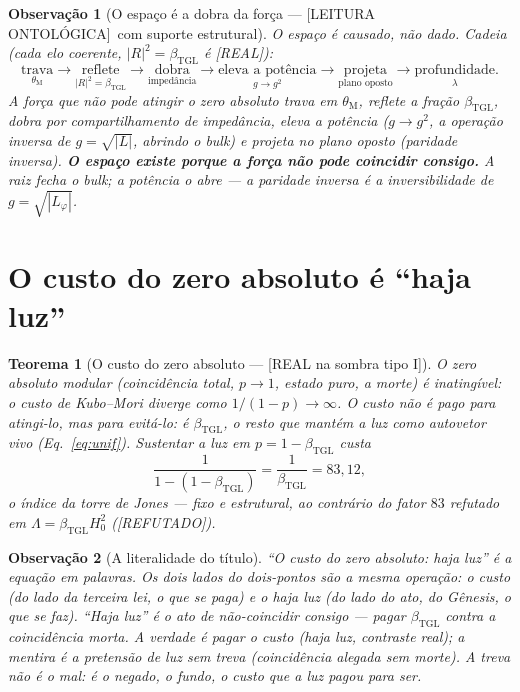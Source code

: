 \documentclass[11pt,a4paper]{article}
\newcommand{\REAL}{\textsf{[REAL]}}
\newcommand{\SOMBRA}{\textsf{[REAL na sombra tipo I]}}
\newcommand{\REF}{\textsf{[REFUTADO]}}
\newcommand{\ONTO}{\textsf{[LEITURA ONTOLÓGICA]}}
\newcommand{\bTGL}{\beta_{\mathrm{TGL}}}
\newcommand{\thM}{\theta_{\mathrm M}}
\newtheorem{theorem}{Teorema}
\newtheorem{remark}{Observação}
\begin{document}
\begin{remark}[O espaço é a dobra da força --- \ONTO\ com suporte estrutural]
O espaço é causado, não dado. Cadeia (cada elo coerente, $|R|^2=\bTGL$ é
\REAL):
\begin{equation}
\underset{\thM}{\text{trava}}
\to
\underset{|R|^2=\bTGL}{\text{reflete}}
\to
\underset{\text{impedância}}{\text{dobra}}
\to
\underset{g\to g^2}{\text{eleva a potência}}
\to
\underset{\text{plano oposto}}{\text{projeta}}
\to
\underset{\lambda}{\text{profundidade}}.
\end{equation}
A força que não pode atingir o zero absoluto trava em $\thM$, reflete a
fração $\bTGL$, dobra por compartilhamento de impedância, eleva a potência
($g\to g^2$, a \emph{operação inversa} de $g=\sqrt{|L|}$, abrindo o bulk) e
projeta no plano oposto (paridade inversa). \textbf{O espaço existe porque a
força não pode coincidir consigo.} A raiz fecha o bulk; a potência o abre ---
a paridade inversa é a inversibilidade de $g=\sqrt{|L_\varphi|}$.
\end{remark}

\section{O custo do zero absoluto é ``haja luz''}\label{sec:hajaluz}
\begin{theorem}[O custo do zero absoluto --- \SOMBRA]
O zero absoluto modular (coincidência total, $p\to1$, estado puro, a morte)
é inatingível: o custo de Kubo--Mori diverge como $1/(1-p)\to\infty$. O custo
não é pago para \emph{atingi-lo}, mas para \emph{evitá-lo}: é $\bTGL$, o
resto que mantém a luz como autovetor vivo (Eq.~\ref{eq:unif}). Sustentar a
luz em $p=1-\bTGL$ custa
\begin{equation}
\frac{1}{1-(1-\bTGL)}=\frac{1}{\bTGL}=83{,}12,
\end{equation}
o índice da torre de Jones --- \emph{fixo e estrutural}, ao contrário do
fator $83$ refutado em $\Lambda=\bTGL H_0^2$ (\REF).
\end{theorem}

\begin{remark}[A literalidade do título]
``O custo do zero absoluto: haja luz'' é a equação em palavras. Os dois lados
do dois-pontos são a mesma operação: o \emph{custo} (do lado da terceira lei,
o que se paga) e o \emph{haja luz} (do lado do ato, do Gênesis, o que se
faz). ``Haja luz'' é o ato de não-coincidir consigo --- pagar $\bTGL$ contra
a coincidência morta. A verdade é pagar o custo (haja luz, contraste real); a
mentira é a pretensão de luz sem treva (coincidência alegada sem morte). A
treva não é o mal: é o negado, o fundo, o custo que a luz pagou para ser.
\end{remark}
\end{document}
